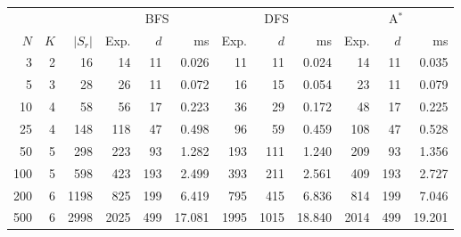 \begin{tabular}{@{}rrr|rrr|rrr|rrr@{}}
\toprule
 & & & \multicolumn{3}{c|}{BFS} & \multicolumn{3}{c|}{DFS} & \multicolumn{3}{c}{A$^*$} \\
$N$ & $K$ & $|S_r|$ & Exp. & $d$ & ms & Exp. & $d$ & ms & Exp. & $d$ & ms \\
\midrule
3 & 2 & 16 & 14 & 11 & 0.026 & 11 & 11 & 0.024 & 14 & 11 & 0.035 \\
5 & 3 & 28 & 26 & 11 & 0.072 & 16 & 15 & 0.054 & 23 & 11 & 0.079 \\
10 & 4 & 58 & 56 & 17 & 0.223 & 36 & 29 & 0.172 & 48 & 17 & 0.225 \\
25 & 4 & 148 & 118 & 47 & 0.498 & 96 & 59 & 0.459 & 108 & 47 & 0.528 \\
50 & 5 & 298 & 223 & 93 & 1.282 & 193 & 111 & 1.240 & 209 & 93 & 1.356 \\
100 & 5 & 598 & 423 & 193 & 2.499 & 393 & 211 & 2.561 & 409 & 193 & 2.727 \\
200 & 6 & 1198 & 825 & 199 & 6.419 & 795 & 415 & 6.836 & 814 & 199 & 7.046 \\
500 & 6 & 2998 & 2025 & 499 & 17.081 & 1995 & 1015 & 18.840 & 2014 & 499 & 19.201 \\
\bottomrule
\end{tabular}
